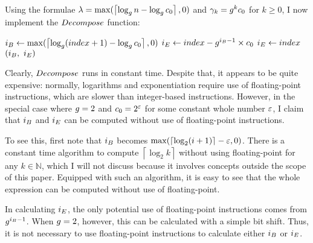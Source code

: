 Using the formulae $\lambda = \max(\left\lceil \log_{g} n - \log_{g} c_0 \right\rceil, 0)$ and $\gamma_k = g^k c_0$ for $k \geq 0$, I now implement the $\FuncDecompose$ function:

\begin{algorithm}[H]
	\caption{\TextHelperFunction}
	\begin{algorithmic}
		\Function{$\FuncDecompose$}{$\ParamIndex$}
			\State $i_B \gets \max(\left\lceil \log_{g} (index + 1) - \log_{g} c_0 \right\rceil, 0)$
				\State $i_E \gets index - g^{i_B - 1} \times c_0$
			\Else
				\State $i_E \gets index$
			\EndIf
			\State \Return $(\LclIndexBuffer,\ \LclIndexElement)$
		\EndFunction
	\end{algorithmic}
\end{algorithm}

Clearly, $\FuncDecompose$ runs in constant time. Despite that, it appears to be quite expensive: normally, logarithms and exponentiation require use of floating-point instructions, which are slower than integer-based instructions. However, in the special case where $g = 2$ and $c_0 = 2^\varepsilon$ for some constant whole number $\varepsilon$, I claim that $i_B$ and $i_E$ can be computed without use of floating-point instructions.

To see this, first note that $i_B$ becomes $\max(\left\lceil \log_2 (i + 1) \right\rceil - \varepsilon, 0)$. There is a constant time algorithm to compute $\left\lceil \log_2 k \right\rceil$ without using floating-point for any $k \in \mathbb{N}$, which I will not discuss because it involves concepts outside the scope of this paper. Equipped with such an algorithm, it is easy to see that the whole expression can be computed without use of floating-point.

In calculating $i_E$, the only potential use of floating-point instructions comes from $g^{i_B - 1}$. When $g = 2$, however, this can be calculated with a simple bit shift. Thus, it is not necessary to use floating-point instructions to calculate either $i_B$ or $i_E$.